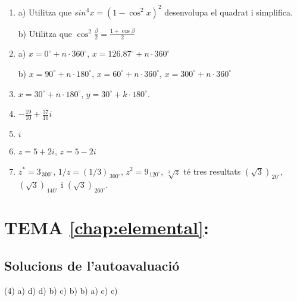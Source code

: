 \begin{enumerate}
\item a) Utilitza que $sin^4 x = (1-\cos^2 x)^2$ desenvolupa el quadrat i simplifica.

b) Utilitza que $\cos^2 \frac{\beta}{2} = \frac{1+\cos \beta}{2}$

\item a) $x= 0^\circ+ n\cdot 360^\circ$, $x=126.87^\circ+ n\cdot 360^\circ$

b) $x= 90^\circ+ n\cdot 180^\circ$, $x= 60^\circ+ n\cdot 360^\circ$, $x= 300^\circ+ n\cdot 360^\circ$

\item $x=30^\circ + n\cdot 180^\circ$, $y=30^\circ + k\cdot 180^\circ$.

\item $-\frac{19}{10}+\frac{37}{10}i$

\item $i$

\item $z=5+2i$, $z=5-2i$ 

\item $z^*=3_{\, 300^\circ}$, $1/z=(1/3)_{\, 300^\circ}$, $z^2=9_{\, 120^\circ}$, $\sqrt[3]{z}$ té tres resultats $(\sqrt{3})_{\, 20^\circ}$, $(\sqrt{3})_{\, 140^\circ}$ i $(\sqrt{3})_{\, 260^\circ}$.
\end{enumerate}




\section*{TEMA \ref{chap:elemental}: }
\subsection*{Solucions de l'autoavaluació}
\begin{tasks}[style=enumerate,label-width=4ex](4)
	\task a)
	\task d)
	\task d)
	\task b)
	\task c)
	\task b)
	\task b)
	\task a)
	\task c)
	\task c)
	\end{tasks}





